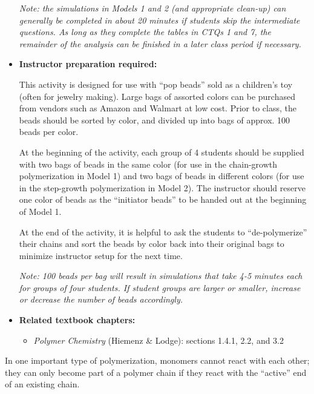 \begin{activity}
\begin{instructornotes}
\begin{itemize}
			\emph{Note: the simulations in Models 1 and 2 (and appropriate clean-up) can generally be completed in about 20 minutes if students skip the intermediate questions.  As long as they complete the tables in CTQs 1 and 7, the remainder of the analysis can be finished in a later class period if necessary.}
			
		\item \textbf{Instructor preparation required:} 
		
			This activity is designed for use with ``pop beads'' sold as a children's toy (often for jewelry making).  Large bags of assorted colors can be purchased from vendors such as Amazon and Walmart at low cost.  Prior to class, the beads should be sorted by color, and divided up into bags of approx. 100 beads per color.
		
			At the beginning of the activity, each group of 4 students should be supplied with two bags of beads in the same color (for use in the chain-growth polymerization in Model 1) and two bags of beads in different colors (for use in the step-growth polymerization in Model 2).  The instructor should reserve one color of beads as the ``initiator beads'' to be handed out at the beginning of Model 1.
		
			At the end of the activity, it is helpful to ask the students to ``de-polymerize'' their chains and sort the beads by color back into their original bags to minimize instructor setup for the next time.
			
			\emph{Note: 100 beads per bag will result in simulations that take 4-5 minutes each for groups of four students.  If student groups are larger or smaller, increase or decrease the number of beads accordingly.}
		
		\item \textbf{Related textbook chapters:}
			\begin{itemize}
				\item \emph{Polymer Chemistry} (Hiemenz \& Lodge): sections 1.4.1, 2.2, and 3.2
			\end{itemize}
	\end{itemize}

\end{instructornotes}

\newcommand{\timeallowed}{3 minutes}

\begin{model}
\label{\labelbase:mdl:chaingrowth}

	In one important type of polymerization, monomers cannot react with each other; they can only become part of a polymer chain if they react with the ``active'' end of an existing chain.
	

\end{model}
\end{activity}

